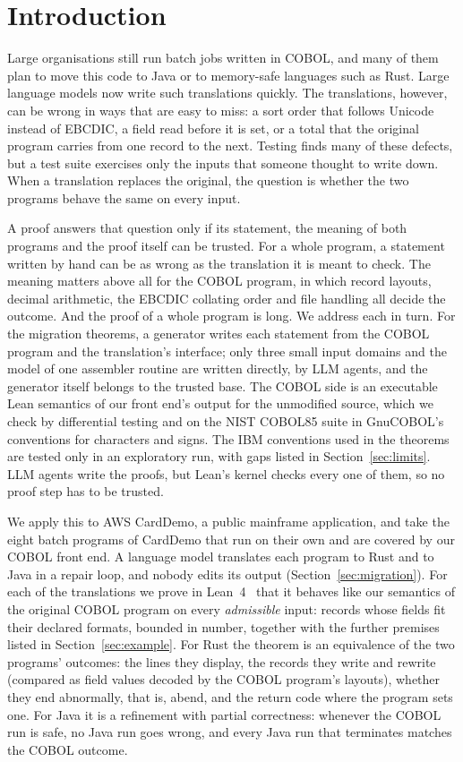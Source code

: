 \section{Introduction}
\label{sec:intro}

Large organisations still run batch jobs written in COBOL, and many of them plan to move this code to Java or to
memory-safe languages such as Rust. Large language models now write such translations quickly. The translations, however,
can be wrong in ways that are easy to miss: a sort order that follows Unicode instead of EBCDIC, a field read before it
is set, or a total that the original program carries from one record to the next. Testing finds many of these
defects, but a test suite exercises only the inputs that someone thought to write down. When a translation replaces the
original, the question is whether the two programs behave the same on every input.

A proof answers that question only if its statement, the meaning of both programs and the proof itself can be
trusted. For a whole program, a statement written by hand can be as wrong as the translation it is meant to check.
The meaning matters above all for the COBOL program, in which record layouts, decimal arithmetic, the EBCDIC
collating order and file handling all decide the outcome. And the proof of a whole program is long. We address
each in turn. For the \aTheorems{} migration theorems, a generator writes each statement from the COBOL program and the translation's
interface; only three
small input domains and the model of one assembler routine are written directly, by LLM agents, and the generator itself belongs to the trusted base. The COBOL side is an executable Lean semantics of our front end's
output for the unmodified source, which we check by differential testing and on the NIST COBOL85 suite in GnuCOBOL's conventions for characters and signs. The IBM conventions used in the theorems are tested only in an
exploratory run, with gaps listed in Section~\ref{sec:limits}. LLM agents write the proofs, but Lean's kernel checks
every one of them, so no proof step has to be trusted.

We apply this to AWS CardDemo, a public mainframe application, and take the eight batch programs of CardDemo that run
on their own and are covered by our COBOL front end. A language model translates each program to Rust and to Java in a
repair loop, and nobody edits its output (Section~\ref{sec:migration}). For each of the \aTheorems{} translations we
prove in Lean~4~\cite{lean4} that it behaves like our semantics of the original COBOL program on every \emph{admissible}
input: records whose fields fit their declared formats, bounded in number, together with the further premises listed in Section~\ref{sec:example}. For Rust
the theorem is an equivalence of the two programs' outcomes: the lines they display, the records they write and rewrite
(compared as field values decoded by the COBOL program's layouts), whether they end abnormally, that is, abend, and the
return code where the program sets one. For
Java it is a refinement with partial correctness: whenever the COBOL run is safe, no Java run goes wrong, and every
Java run that terminates matches the COBOL outcome.

